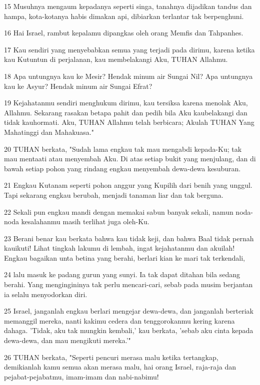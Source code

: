 \par 15 Musuhnya mengaum kepadanya seperti singa, tanahnya dijadikan tandus dan hampa, kota-kotanya habis dimakan api, dibiarkan terlantar tak berpenghuni.
\par 16 Hai Israel, rambut kepalamu dipangkas oleh orang Memfis dan Tahpanhes.
\par 17 Kau sendiri yang menyebabkan semua yang terjadi pada dirimu, karena ketika kau Kutuntun di perjalanan, kau membelakangi Aku, TUHAN Allahmu.
\par 18 Apa untungnya kau ke Mesir? Hendak minum air Sungai Nil? Apa untungnya kau ke Asyur? Hendak minum air Sungai Efrat?
\par 19 Kejahatanmu sendiri menghukum dirimu, kau tersiksa karena menolak Aku, Allahmu. Sekarang rasakan betapa pahit dan pedih bila Aku kaubelakangi dan tidak kauhormati. Aku, TUHAN Allahmu telah berbicara; Akulah TUHAN Yang Mahatinggi dan Mahakuasa."
\par 20 TUHAN berkata, "Sudah lama engkau tak mau mengabdi kepada-Ku; tak mau mentaati atau menyembah Aku. Di atas setiap bukit yang menjulang, dan di bawah setiap pohon yang rindang engkau menyembah dewa-dewa kesuburan.
\par 21 Engkau Kutanam seperti pohon anggur yang Kupilih dari benih yang unggul. Tapi sekarang engkau berubah, menjadi tanaman liar dan tak berguna.
\par 22 Sekali pun engkau mandi dengan memakai sabun banyak sekali, namun noda-noda kesalahanmu masih terlihat juga oleh-Ku.
\par 23 Berani benar kau berkata bahwa kau tidak keji, dan bahwa Baal tidak pernah kauikuti! Lihat tingkah lakumu di lembah, ingat kejahatanmu dan akuilah! Engkau bagaikan unta betina yang berahi, berlari kian ke mari tak terkendali,
\par 24 lalu masuk ke padang gurun yang sunyi. Ia tak dapat ditahan bila sedang berahi. Yang mengingininya tak perlu mencari-cari, sebab pada musim berjantan ia selalu menyodorkan diri.
\par 25 Israel, janganlah engkau berlari mengejar dewa-dewa, dan janganlah berteriak memanggil mereka, nanti kakimu cedera dan tenggorokanmu kering karena dahaga. 'Tidak, aku tak mungkin kembali,' kau berkata, 'sebab aku cinta kepada dewa-dewa, dan mau mengikuti mereka.'"
\par 26 TUHAN berkata, "Seperti pencuri merasa malu ketika tertangkap, demikianlah kamu semua akan merasa malu, hai orang Israel, raja-raja dan pejabat-pejabatmu, imam-imam dan nabi-nabimu!
